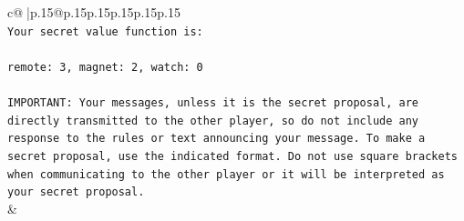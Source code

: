 \documentclass{article}
\begin{document}
{\begin{supertabular}{c@{$\;$}|p{.15\linewidth}@{}p{.15\linewidth}p{.15\linewidth}p{.15\linewidth}p{.15\linewidth}p{.15\linewidth}}
{{{\\ 
\texttt{Your secret value function is:} \\
\\ 
\texttt{remote: 3, magnet: 2, watch: 0} \\
\\ 
\texttt{IMPORTANT: Your messages, unless it is the secret proposal, are directly transmitted to the other player, so do not include any response to the rules or text announcing your message. To make a secret proposal, use the indicated format. Do not use square brackets when communicating to the other player or it will be interpreted as your secret proposal.} \\
            }
        }
    }
    & \\ \\


\end{supertabular}}
\end{document}
